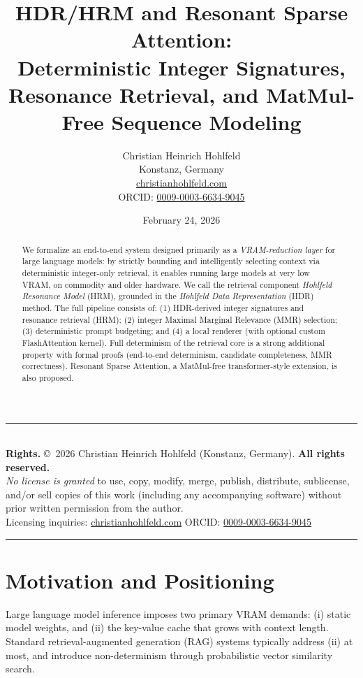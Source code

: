 \documentclass[11pt,a4paper]{article}
\title{HDR/HRM and Resonant Sparse Attention:\\
Deterministic Integer Signatures, Resonance Retrieval, and MatMul-Free Sequence Modeling}
\author{Christian Heinrich Hohlfeld\\
Konstanz, Germany\\
\href{https://christianhohlfeld.com}{christianhohlfeld.com}\\
ORCID: \href{https://orcid.org/0009-0003-6634-9045}{0009-0003-6634-9045}}
\date{February 24, 2026}
\theoremstyle{definition}
\theoremstyle{plain}
\theoremstyle{remark}
\begin{document}
\maketitle

\vspace{-0.4em}
\noindent\rule{\linewidth}{0.4pt}\\
\textbf{Rights.}
\copyright\ 2026 Christian Heinrich Hohlfeld (Konstanz, Germany). \textbf{All rights reserved.}\\
\emph{No license is granted} to use, copy, modify, merge, publish, distribute, sublicense, and/or sell
copies of this work (including any accompanying software) without prior written permission from the author.\\
Licensing inquiries: \href{https://christianhohlfeld.com}{christianhohlfeld.com} \quad ORCID: \href{https://orcid.org/0009-0003-6634-9045}{0009-0003-6634-9045}
\noindent\rule{\linewidth}{0.4pt}

\begin{abstract}
We formalize an end-to-end system designed primarily as a \emph{VRAM-reduction layer} for large language models:
by strictly bounding and intelligently selecting context via deterministic integer-only retrieval,
it enables running large models at very low VRAM, on commodity and older hardware.
We call the retrieval component \emph{Hohlfeld Resonance Model} (HRM), grounded in the
\emph{Hohlfeld Data Representation} (HDR) method.
The full pipeline consists of:
(1) HDR-derived integer signatures and resonance retrieval (HRM);
(2) integer Maximal Marginal Relevance (MMR) selection;
(3) deterministic prompt budgeting; and
(4) a local renderer (with optional custom FlashAttention kernel).
Full determinism of the retrieval core is a strong additional property with formal proofs
(end-to-end determinism, candidate completeness, MMR correctness).
Resonant Sparse Attention, a MatMul-free transformer-style extension, is also proposed.
\end{abstract}

\section{Motivation and Positioning}

Large language model inference imposes two primary VRAM demands:
(i) static model weights, and (ii) the key-value cache that grows with context length.
Standard retrieval-augmented generation (RAG) systems typically address (ii) at most,
and introduce non-determinism through probabilistic vector similarity search.
\end{document}
